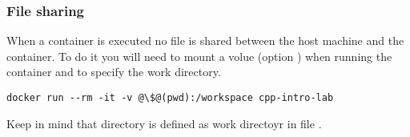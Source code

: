\subsubsection{File sharing}

When a container is executed no file is shared between the host machine and the
container. To do it you will need to mount a volue (option ) when
running the container and to specify the work directory.

\begin{lstlisting}[style=terminal,escapechar=@]
docker run --rm -it -v @\$@(pwd):/workspace cpp-intro-lab
\end{lstlisting}

Keep in mind that directory  
is defined as work directoyr in file .
